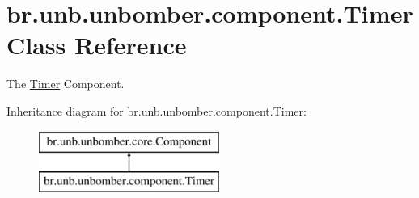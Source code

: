 \hypertarget{classbr_1_1unb_1_1unbomber_1_1component_1_1_timer}{\section{br.\+unb.\+unbomber.\+component.\+Timer Class Reference}
\label{classbr_1_1unb_1_1unbomber_1_1component_1_1_timer}
}


The \hyperlink{classbr_1_1unb_1_1unbomber_1_1component_1_1_timer}{Timer} Component.  


Inheritance diagram for br.\+unb.\+unbomber.\+component.\+Timer\+:\begin{figure}[H]
\begin{center}
\leavevmode
\includegraphics[height=2.000000cm]{classbr_1_1unb_1_1unbomber_1_1component_1_1_timer}
\end{center}
\end{figure}
